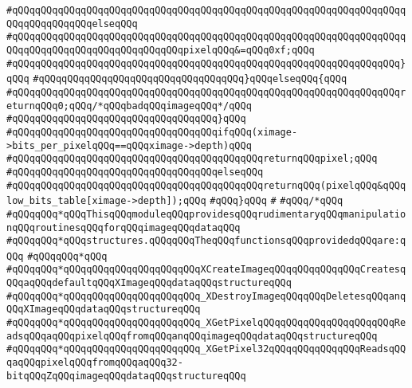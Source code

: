 \verb|#qQQqqQQqqQQqqQQqqQQqqQQqqQQqqQQqqQQqqQQqqQQqqQQqqQQqqQQqqQQqqQQqqQQqqQQqqQQqqQQqqQQqelseqQQq|\newline
\verb|#qQQqqQQqqQQqqQQqqQQqqQQqqQQqqQQqqQQqqQQqqQQqqQQqqQQqqQQqqQQqqQQqqQQqqQQqqQQqqQQqqQQqqQQqqQQqqQQqqQQqpixelqQQq&=qQQq0xf;qQQq|\newline
\verb|#qQQqqQQqqQQqqQQqqQQqqQQqqQQqqQQqqQQqqQQqqQQqqQQqqQQqqQQqqQQqqQQqqQQq}qQQq|\newline
\verb|#qQQqqQQqqQQqqQQqqQQqqQQqqQQqqQQqqQQq}qQQqelseqQQq{qQQq|\newline
\verb|#qQQqqQQqqQQqqQQqqQQqqQQqqQQqqQQqqQQqqQQqqQQqqQQqqQQqqQQqqQQqqQQqqQQqreturnqQQq0;qQQq/*qQQqbadqQQqimageqQQq*/qQQq|\newline
\verb|#qQQqqQQqqQQqqQQqqQQqqQQqqQQqqQQqqQQq}qQQq|\newline
\verb|#qQQqqQQqqQQqqQQqqQQqqQQqqQQqqQQqqQQqifqQQq(ximage->bits_per_pixelqQQq==qQQqximage->depth)qQQq|\newline
\verb|#qQQqqQQqqQQqqQQqqQQqqQQqqQQqqQQqqQQqqQQqqQQqreturnqQQqpixel;qQQq|\newline
\verb|#qQQqqQQqqQQqqQQqqQQqqQQqqQQqqQQqqQQqelseqQQq|\newline
\verb|#qQQqqQQqqQQqqQQqqQQqqQQqqQQqqQQqqQQqqQQqqQQqreturnqQQq(pixelqQQq&qQQqlow_bits_table[ximage->depth]);qQQq|\newline
\verb|#qQQq}qQQq|\newline
\verb|#|\newline
\verb|#qQQq/*qQQq|\newline
\verb|#qQQqqQQq*qQQqThisqQQqmoduleqQQqprovidesqQQqrudimentaryqQQqmanipulationqQQqroutinesqQQqforqQQqimageqQQqdataqQQq|\newline
\verb|#qQQqqQQq*qQQqstructures.qQQqqQQqTheqQQqfunctionsqQQqprovidedqQQqare:qQQq|\newline
\verb|#qQQqqQQq*qQQq|\newline
\verb|#qQQqqQQq*qQQqqQQqqQQqqQQqqQQqqQQqXCreateImageqQQqqQQqqQQqqQQqCreatesqQQqaqQQqdefaultqQQqXImageqQQqdataqQQqstructureqQQq|\newline
\verb|#qQQqqQQq*qQQqqQQqqQQqqQQqqQQqqQQq_XDestroyImageqQQqqQQqDeletesqQQqanqQQqXImageqQQqdataqQQqstructureqQQq|\newline
\verb|#qQQqqQQq*qQQqqQQqqQQqqQQqqQQqqQQq_XGetPixelqQQqqQQqqQQqqQQqqQQqqQQqReadsqQQqaqQQqpixelqQQqfromqQQqanqQQqimageqQQqdataqQQqstructureqQQq|\newline
\verb|#qQQqqQQq*qQQqqQQqqQQqqQQqqQQqqQQq_XGetPixel32qQQqqQQqqQQqqQQqReadsqQQqaqQQqpixelqQQqfromqQQqaqQQq32-bitqQQqZqQQqimageqQQqdataqQQqstructureqQQq|\newline
